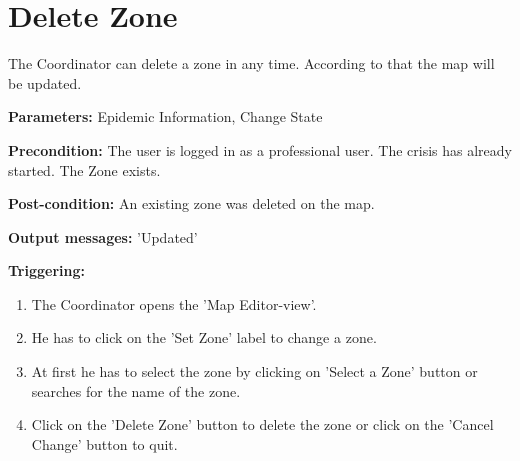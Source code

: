 \section{Delete Zone}
\label{operation:DeleteZone}
The Coordinator can delete a zone in any time. According
to that the map will be updated.\\
\begin{description}
\item \textbf{Parameters:} Epidemic Information, Change State
\item \textbf{Precondition:} The user is logged in as a professional user. The
crisis has already started. The Zone exists.
\item \textbf{Post-condition:} An existing zone was deleted on the map.
\item \textbf{Output messages:} 'Updated'
\item \textbf{Triggering:}
\begin{enumerate}
\item The Coordinator opens the 'Map Editor-view'.
\item He has to click on the 'Set Zone' label to change a zone.
\item At first he has to select the zone by clicking on 'Select a Zone' button
or searches for the name of the zone.
\item Click on the 'Delete Zone' button to delete the zone or click on the
'Cancel Change' button to quit.
\end{enumerate}
\end{description}   





